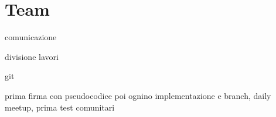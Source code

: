 \chapter*{Team}

comunicazione

divisione lavori

git

prima firma con pseudocodice poi ognino implementazione e branch, daily meetup, prima 
test comunitari